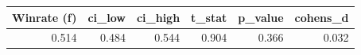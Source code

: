 \begin{tabular}{rrrrrr}
\toprule
Winrate (f) & ci\_low & ci\_high & t\_stat & p\_value & cohens\_d \\
\midrule
0.514 & 0.484 & 0.544 & 0.904 & 0.366 & 0.032 \\
\bottomrule
\end{tabular}
